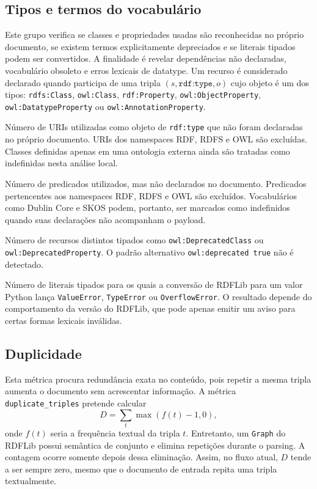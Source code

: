 \documentclass[12pt,a4paper]{article}
\newcommand{\metrica}[1]{\texttt{#1}}
\begin{document}
\subsection{Tipos e termos do vocabulário}
Este grupo verifica se classes e propriedades usadas são reconhecidas no próprio documento, se existem termos explicitamente depreciados e se literais tipados podem ser convertidos. A finalidade é revelar dependências não declaradas, vocabulário obsoleto e erros lexicais de datatype.
Um recurso é considerado declarado quando participa de uma tripla \((s,\texttt{rdf:type},o)\) cujo objeto é um dos tipos: \texttt{rdfs:Class}, \texttt{owl:Class}, \texttt{rdf:Property}, \texttt{owl:ObjectProperty}, \texttt{owl:DatatypeProperty} ou \texttt{owl:AnnotationProperty}.
\begin{description}[style=nextline]
  \item[\metrica{undefined\_classes}]
Número de URIs utilizadas como objeto de \texttt{rdf:type} que não foram declaradas no próprio documento. URIs dos namespaces RDF, RDFS e OWL são excluídas. Classes definidas apenas em uma ontologia externa ainda são tratadas como indefinidas nesta análise local.
  \item[\metrica{undefined\_properties}]
Número de predicados utilizados, mas não declarados no documento. Predicados pertencentes aos namespaces RDF, RDFS e OWL são excluídos. Vocabulários como Dublin Core e SKOS podem, portanto, ser marcados como indefinidos quando suas declarações não acompanham o payload.
  \item[\metrica{deprecated\_terms}]
Número de recursos distintos tipados como \texttt{owl:DeprecatedClass} ou \texttt{owl:DeprecatedProperty}. O padrão alternativo \texttt{owl:deprecated true} não é detectado.
  \item[\metrica{malformed\_datatype\_literals}]
Número de literais tipados para os quais a conversão de RDFLib para um valor Python lança \texttt{ValueError}, \texttt{TypeError} ou \texttt{OverflowError}. O resultado depende do comportamento da versão do RDFLib, que pode apenas emitir um aviso para certas formas lexicais inválidas.
\end{description}
\subsection{Duplicidade}
Esta métrica procura redundância exata no conteúdo, pois repetir a mesma tripla aumenta o documento sem acrescentar informação.
A métrica \metrica{duplicate\_triples} pretende calcular
\[
D = \sum_{t} \max(f(t)-1,0),
\]
onde \(f(t)\) seria a frequência textual da tripla \(t\). Entretanto, um \texttt{Graph} do RDFLib possui semântica de conjunto e elimina repetições durante o parsing. A contagem ocorre somente depois dessa eliminação. Assim, no fluxo atual, \(D\) tende a ser sempre zero, mesmo que o documento de entrada repita uma tripla textualmente.
\end{document}
